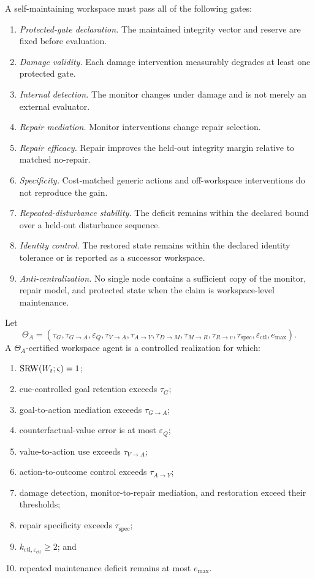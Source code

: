
A self-maintaining workspace must pass all of the following gates:
\begin{enumerate}
\item \emph{Protected-gate declaration.} The maintained integrity vector and
 reserve are fixed before evaluation.
\item \emph{Damage validity.} Each damage intervention measurably degrades at
 least one protected gate.
\item \emph{Internal detection.} The monitor changes under damage and is not
 merely an external evaluator.
\item \emph{Repair mediation.} Monitor interventions change repair selection.
\item \emph{Repair efficacy.} Repair improves the held-out integrity margin
 relative to matched no-repair.
\item \emph{Specificity.} Cost-matched generic actions and off-workspace
 interventions do not reproduce the gain.
\item \emph{Repeated-disturbance stability.} The deficit remains within the
 declared bound over a held-out disturbance sequence.
\item \emph{Identity control.} The restored state remains within the declared
 identity tolerance or is reported as a successor workspace.
\item \emph{Anti-centralization.} No single node contains a sufficient copy
 of the monitor, repair model, and protected state when the claim is
 workspace-level maintenance.
\end{enumerate}


Let
\[
\Theta_A
=
\left(
\tau_G,
\tau_{G\to A},
\varepsilon_Q,
\tau_{V\to A},
\tau_{A\to Y},
\tau_{D\to M},
\tau_{M\to R},
\tau_{R\to v},
\tau_{\mathrm{spec}},
\varepsilon_{\mathrm{ctl}},
 e_{\max}
\right).
\]
A \(\Theta_A\)-certified workspace agent is a controlled realization for
which:
\begin{enumerate}
\item \(\operatorname{SRW}(W_t;\varsigma)=1\);
\item cue-controlled goal retention exceeds \(\tau_G\);
\item goal-to-action mediation exceeds \(\tau_{G\to A}\);
\item counterfactual-value error is at most \(\varepsilon_Q\);
\item value-to-action use exceeds \(\tau_{V\to A}\);
\item action-to-outcome control exceeds \(\tau_{A\to Y}\);
\item damage detection, monitor-to-repair mediation, and restoration exceed
 their thresholds;
\item repair specificity exceeds \(\tau_{\mathrm{spec}}\);
\item \(k_{\mathrm{ctl},\varepsilon_{\mathrm{ctl}}}\geq2\); and
\item repeated maintenance deficit remains at most \(e_{\max}\).
\end{enumerate}

